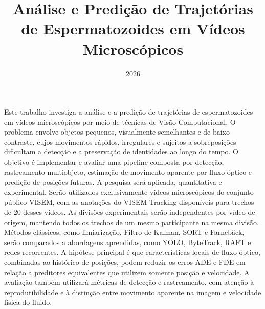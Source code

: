 \documentclass{bcc}
\title{Análise e Predição de Trajetórias de Espermatozoides em Vídeos Microscópicos}
\date{2026}
\begin{document}
	
	\pretextual
	
	\maketitle

	
	
	
	
	\begin{resumo}{}
		Este trabalho investiga a análise e a predição de trajetórias de espermatozoides em vídeos microscópicos por meio de técnicas de Visão Computacional. O problema envolve objetos pequenos, visualmente semelhantes e de baixo contraste, cujos movimentos rápidos, irregulares e sujeitos a sobreposições dificultam a detecção e a preservação de identidades ao longo do tempo. O objetivo é implementar e avaliar uma pipeline composta por detecção, rastreamento multiobjeto, estimação de movimento aparente por fluxo óptico e predição de posições futuras. A pesquisa será aplicada, quantitativa e experimental. Serão utilizados exclusivamente vídeos microscópicos do conjunto público VISEM, com as anotações do VISEM-Tracking disponíveis para trechos de 20 desses vídeos. As divisões experimentais serão independentes por vídeo de origem, mantendo todos os trechos de um mesmo participante na mesma divisão. Métodos clássicos, como limiarização, Filtro de Kalman, SORT e Farnebäck, serão comparados a abordagens aprendidas, como YOLO, ByteTrack, RAFT e redes recorrentes. A hipótese principal é que características locais de fluxo óptico, combinadas ao histórico de posições, podem reduzir os erros ADE e FDE em relação a preditores equivalentes que utilizem somente posição e velocidade. A avaliação também utilizará métricas de detecção e rastreamento, com atenção à reprodutibilidade e à distinção entre movimento aparente na imagem e velocidade física do fluido.
	\end{resumo}	
\end{document}
